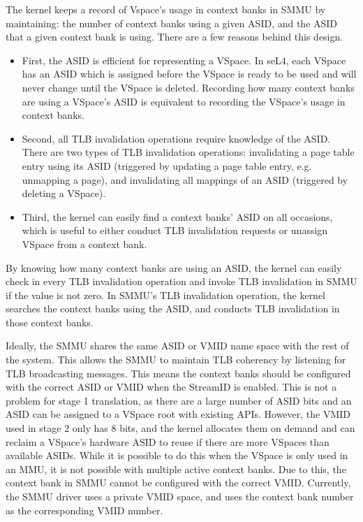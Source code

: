 The kernel keeps a record of Vspace's usage in context banks in SMMU by
maintaining: the number of context banks using a given ASID, and the ASID that a
given context bank is using. There are a few reasons behind this design.
\begin{itemize}
\item First, the ASID is efficient for representing a VSpace. In seL4, each VSpace has
an ASID which is assigned before the VSpace is ready to be used and will never
change until the VSpace is deleted. Recording how many context banks are using a
VSpace's ASID is equivalent to recording the VSpace's usage in context banks.
\item Second, all TLB invalidation operations require knowledge of the ASID. There are
two types of TLB invalidation operations: invalidating a page table entry using
its ASID (triggered by updating a page table entry, e.g. unmapping a page), and
invalidating all mappings of an ASID (triggered by deleting a VSpace).
\item Third, the kernel can easily find a context banks' ASID on all occasions, which is
useful to either conduct TLB invalidation requests or unassign VSpace from a
context bank.
\end{itemize}

By knowing how many context banks are using an ASID, the kernel can easily check
in every TLB invalidation operation and invoke TLB invalidation in SMMU if the
value is not zero. In SMMU's TLB invalidation operation, the kernel searches the
context banks using the ASID, and conducts TLB invalidation in those context banks.

Ideally, the SMMU shares the same ASID or VMID name space with the rest of the
system. This allows the SMMU to maintain TLB coherency by listening for TLB
broadcasting messages. This means the context banks should be configured with
the correct ASID or VMID when the StreamID is enabled. This is not a problem for
stage 1 translation, as there are a large number of ASID bits and an ASID can be
assigned to a VSpace root with existing APIs. However, the VMID used in stage 2
only has 8 bits, and the kernel allocates them on demand and can reclaim a
VSpace's hardware ASID to reuse if there are more VSpaces than available ASIDs.
While it is possible to do this when the VSpace is only used in an MMU, it is
not possible with multiple active context banks.
Due to this, the context bank in SMMU cannot be configured with the correct VMID.
Currently, the SMMU driver uses a private VMID space, and uses the context bank
number as the corresponding VMID number.



